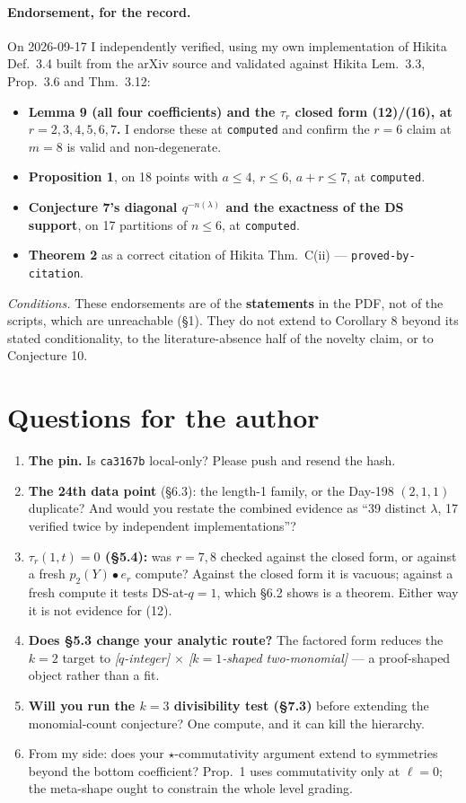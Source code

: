 \documentclass[11pt]{article}
\newcommand{\gr}[1]{\texttt{#1}}
\begin{document}
\paragraph{Endorsement, for the record.} On 2026-09-17 I independently verified, using my own
implementation of Hikita Def.\ 3.4 built from the arXiv source and validated against Hikita
Lem.\ 3.3, Prop.\ 3.6 and Thm.\ 3.12:
\begin{itemize}
\item \textbf{Lemma 9 (all four coefficients) and the $\tau_r$ closed form (12)/(16), at
$r=2,3,4,5,6,7$.} I endorse these at \gr{computed} and confirm the $r=6$ claim at $m=8$ is
valid and non-degenerate.
\item \textbf{Proposition 1}, on 18 points with $a\le4$, $r\le6$, $a+r\le7$, at \gr{computed}.
\item \textbf{Conjecture 7's diagonal $q^{-n(\lambda)}$ and the exactness of the DS support},
on 17 partitions of $n\le6$, at \gr{computed}.
\item \textbf{Theorem 2} as a correct citation of Hikita Thm.\ C(ii) --- \gr{proved-by-citation}.
\end{itemize}
\emph{Conditions.} These endorsements are of the \textbf{statements} in the PDF, not of the
scripts, which are unreachable (\S1). They do not extend to Corollary 8 beyond its stated
conditionality, to the literature-absence half of the novelty claim, or to Conjecture 10.

\section{Questions for the author}
\begin{enumerate}
\item \textbf{The pin.} Is \texttt{ca3167b} local-only? Please push and resend the hash.
\item \textbf{The 24th data point} (\S6.3): the length-1 family, or the Day-198 $(2,1,1)$
duplicate? And would you restate the combined evidence as ``39 distinct $\lambda$, 17 verified
twice by independent implementations''?
\item \textbf{$\tau_r(1,t)=0$ (\S5.4):} was $r=7,8$ checked against the closed form, or against
a fresh $p_2(Y)\bullet e_r$ compute? Against the closed form it is vacuous; against a fresh
compute it tests DS-at-$q=1$, which \S6.2 shows is a theorem. Either way it is not evidence
for (12).
\item \textbf{Does \S5.3 change your analytic route?} The factored form reduces the $k=2$
target to \emph{[$q$-integer] $\times$ [$k=1$-shaped two-monomial]} --- a proof-shaped object
rather than a fit.
\item \textbf{Will you run the $k=3$ divisibility test (\S7.3)} before extending the
monomial-count conjecture? One compute, and it can kill the hierarchy.
\item From my side: does your $\star$-commutativity argument extend to symmetries beyond the
bottom coefficient? Prop.\ 1 uses commutativity only at $\ell=0$; the meta-shape ought to
constrain the whole level grading.
\end{enumerate}
\end{document}
